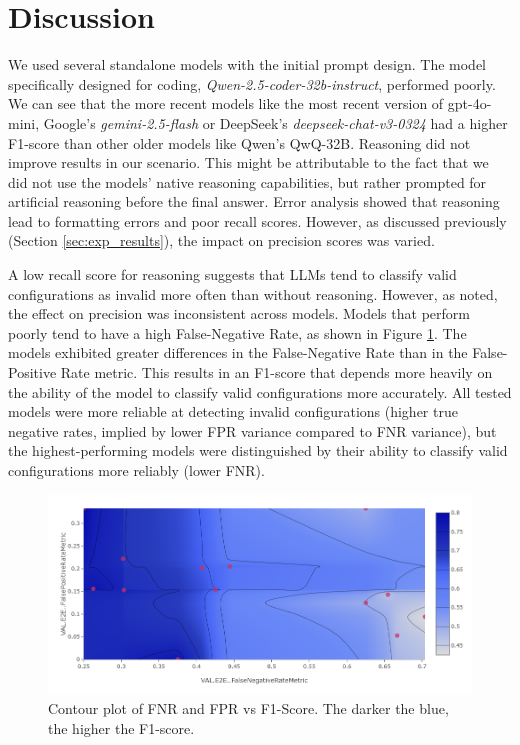\section{Discussion} \label{sec:exp_discussion}

We used several standalone models with the initial prompt design. The model specifically designed for coding, \textit{Qwen-2.5-coder-32b-instruct}, performed poorly. We can see that the more recent models like the most recent version of gpt-4o-mini, Google's \textit{gemini-2.5-flash} or DeepSeek's \textit{deepseek-chat-v3-0324} had a higher F1-score than other older models like Qwen's QwQ-32B. Reasoning did not improve results in our scenario. This might be attributable to the fact that we did not use the models' native reasoning capabilities, but rather prompted for artificial reasoning before the final answer. Error analysis showed that reasoning lead to formatting errors and poor recall scores. However, as discussed previously (Section \ref{sec:exp_results}), the impact on precision scores was varied.

A low recall score for reasoning suggests that LLMs tend to classify valid configurations as invalid more often than without reasoning. However, as noted, the effect on precision was inconsistent across models. Models that perform poorly tend to have a high False-Negative Rate, as shown in Figure \ref{fig:fnrfpr}. The models exhibited greater differences in the False-Negative Rate than in the False-Positive Rate metric. This results in an F1-score that depends more heavily on the ability of the model to classify valid configurations more accurately. All tested models were more reliable at detecting invalid configurations (higher true negative rates, implied by lower FPR variance compared to FNR variance), but the highest-performing models were distinguished by their ability to classify valid configurations more reliably (lower FNR).

\begin{figure}[!ht]
    \centering
    \includegraphics[width=\textwidth]{images/FNR-FPR-F1.png}
    \caption{Contour plot of FNR and FPR vs F1-Score. The darker the blue, the higher the F1-score.}
    \label{fig:fnrfpr}
\end{figure}

